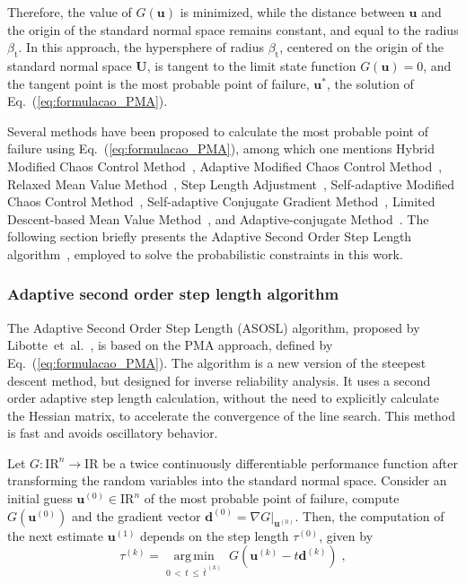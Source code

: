 \documentclass[final,5p,times,twocolumn,numbers]{elsarticle}
\DeclareMathOperator*{\argmin}{arg\,min}
\begin{document}
\noindent Therefore, the value of $ G \left( \mathbf{u} \right) $ is minimized, while the distance between $ \mathbf{u} $ and the origin of the standard normal space remains constant, and equal to the radius $ \beta_{\mathrm{t}} $. In this approach, the hypersphere of radius $ \beta_{\mathrm{t}} $, centered on the origin of the standard normal space $ \mathbf {U} $, is tangent to the limit state function $ G \left( \mathbf{u} \right) = 0 $, and the tangent point is the most probable point of failure, $ \mathbf{u}^{*} $, the solution of Eq.~(\ref{eq:formulacao_PMA}).

Several methods have been proposed to calculate the most probable point of failure using Eq.~(\ref{eq:formulacao_PMA}), among which one mentions Hybrid Modified Chaos Control Method~\cite{bib:meng2015}, Adaptive Modified Chaos Control Method~\cite{bib:li2015}, Relaxed Mean Value Method~\cite{bib:keshtegar2016}, Step Length Adjustment~\cite{bib:yi2016}, Self-adaptive Modified Chaos Control Method~\cite{bib:keshtegar2017a}, Self-adaptive Conjugate Gradient Method~\cite{bib:keshtegar2018b}, Limited Descent-based Mean Value Method~\cite{bib:yaseen2018}, and Adaptive-conjugate Method~\cite{bib:meng2019}. The following section briefly presents the Adaptive Second Order Step Length algorithm~\cite{bib:libotte2020}, employed to solve the probabilistic constraints in this work.

\subsubsection{Adaptive second order step length algorithm} \label{sec:asosl}

The Adaptive Second Order Step Length (ASOSL) algorithm, proposed by Libotte~et~al.~\cite{bib:libotte2020}, is based on the PMA approach, defined by Eq.~(\ref{eq:formulacao_PMA}). The algorithm is a new version of the steepest descent method, but designed for inverse reliability analysis. It uses a second order adaptive step length calculation, without the need to explicitly calculate the Hessian matrix, to accelerate the convergence of the line search. This method is fast and avoids oscillatory behavior.

Let $ G : \mathrm{I\!R}^{n} \rightarrow \mathrm{I\!R} $ be a twice continuously differentiable performance function after transforming the random variables into the standard normal space. Consider an initial guess $ \mathbf{u}^{\left( 0 \right)} \in \mathrm{I\!R}^{n} $ of the most probable point of failure, compute $ G \left( \mathbf{u}^{\left( 0 \right)} \right) $ and the gradient vector $ \mathbf{d}^{\left( 0 \right)} = \left. \nabla G \right\rvert_{\mathbf{u}^{\left( 0 \right)}} $. Then, the computation of the next estimate $ \mathbf{u}^{\left( 1 \right)} $ depends on the step length $ \tau^{\left( 0 \right)} $, given by
%
\begin{equation} \label{eq:busca_linear_passo_otimo}
\tau^{\left( k \right)} = \argmin\limits_{0 \, < \, t \, \leq \, \bar{t}^{\, \left( k \right)}} \; G \left( \mathbf{u}^{\left( k \right)} - t \mathbf{d}^{\left( k \right)} \right) \; ,
\end{equation}
\end{document}
